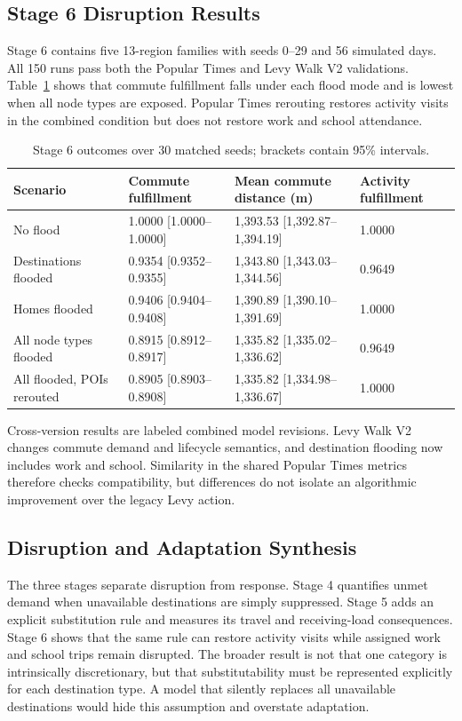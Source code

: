 \documentclass[pdflatex,sn-mathphys-num]{sn-jnl}%
\theoremstyle{thmstyleone}%
\theoremstyle{thmstyletwo}%
\theoremstyle{thmstylethree}%
\begin{document}
\subsection{Stage 6 Disruption Results}
Stage 6 contains five 13-region families with seeds 0--29 and 56 simulated days. All 150 runs pass both the Popular Times and Levy Walk V2 validations. Table~\ref{tbl:levy_v2} shows that commute fulfillment falls under each flood mode and is lowest when all node types are exposed. Popular Times rerouting restores activity visits in the combined condition but does not restore work and school attendance.

\begin{table}[ht]
\centering
\footnotesize
\caption{Stage 6 outcomes over 30 matched seeds; brackets contain 95\% intervals.}
\label{tbl:levy_v2}
\begin{tabularx}{\linewidth}{@{}lXXX@{}}
\toprule
\textbf{Scenario} & \textbf{Commute fulfillment} & \textbf{Mean commute distance (m)} & \textbf{Activity fulfillment} \\ \midrule
No flood & 1.0000 [1.0000--1.0000] & 1,393.53 [1,392.87--1,394.19] & 1.0000 \\ 
Destinations flooded & 0.9354 [0.9352--0.9355] & 1,343.80 [1,343.03--1,344.56] & 0.9649 \\ 
Homes flooded & 0.9406 [0.9404--0.9408] & 1,390.89 [1,390.10--1,391.69] & 1.0000 \\ 
All node types flooded & 0.8915 [0.8912--0.8917] & 1,335.82 [1,335.02--1,336.62] & 0.9649 \\ 
All flooded, POIs rerouted & 0.8905 [0.8903--0.8908] & 1,335.82 [1,334.98--1,336.67] & 1.0000 \\ \bottomrule
\end{tabularx}
\end{table}

Cross-version results are labeled combined model revisions. Levy Walk V2 changes commute demand and lifecycle semantics, and destination flooding now includes work and school. Similarity in the shared Popular Times metrics therefore checks compatibility, but differences do not isolate an algorithmic improvement over the legacy Levy action.



\subsection{Disruption and Adaptation Synthesis}
The three stages separate disruption from response. Stage 4 quantifies unmet demand when unavailable destinations are simply suppressed. Stage 5 adds an explicit substitution rule and measures its travel and receiving-load consequences. Stage 6 shows that the same rule can restore activity visits while assigned work and school trips remain disrupted. The broader result is not that one category is intrinsically discretionary, but that substitutability must be represented explicitly for each destination type. A model that silently replaces all unavailable destinations would hide this assumption and overstate adaptation.
\end{document}
